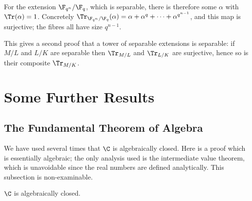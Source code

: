 \begin{example}
	For the extension $\F_{q^n}/\F_q$, which is separable, there is therefore some $\alpha$ with $\Tr(\alpha) = 1$. Concretely $\Tr_{\F_{q^n}/\F_q}(\alpha) = \alpha+\alpha^q+\dots+\alpha^{q^{n-1}}$, and this map is surjective; the fibres all have size $q^{n-1}$.
\end{example}

\begin{remark}
	This gives a second proof that a tower of separable extensions is separable: if $M/L$ and $L/K$ are separable then $\Tr_{M/L}$ and $\Tr_{L/K}$ are surjective, hence so is their composite $\Tr_{M/K}$.
\end{remark}

\section{Some Further Results}\label{sec:further}

\subsection{The Fundamental Theorem of Algebra}

We have used several times that $\C$ is algebraically closed. Here is a proof which is essentially algebraic; the only analysis used is the intermediate value theorem, which is unavoidable since the real numbers are defined analytically. This subsection is non-examinable.

\begin{theorem}
	$\C$ is algebraically closed.
\end{theorem}

